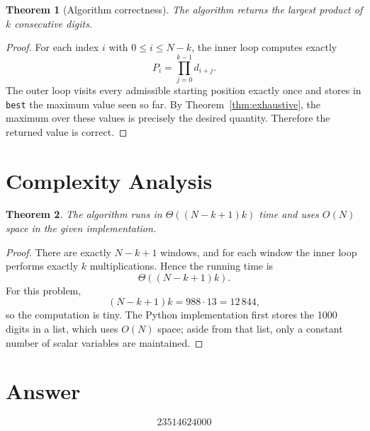 \documentclass[11pt]{article}
\newtheorem{theorem}{Theorem}
\begin{document}
\begin{theorem}[Algorithm correctness]
The algorithm returns the largest product of $k$ consecutive digits.
\end{theorem}

\begin{proof}
For each index $i$ with $0 \le i \le N-k$, the inner loop computes exactly
\[
P_i = \prod_{j=0}^{k-1} d_{i+j}.
\]
The outer loop visits every admissible starting position exactly once and stores in \texttt{best} the maximum value seen so far. By Theorem~\ref{thm:exhaustive}, the maximum over these values is precisely the desired quantity. Therefore the returned value is correct.
\end{proof}

\section{Complexity Analysis}

\begin{theorem}
The algorithm runs in $\Theta((N-k+1)k)$ time and uses $O(N)$ space in the given implementation.
\end{theorem}

\begin{proof}
There are exactly $N-k+1$ windows, and for each window the inner loop performs exactly $k$ multiplications. Hence the running time is
\[
\Theta((N-k+1)k).
\]
For this problem,
\[
(N-k+1)k = 988 \cdot 13 = 12\,844,
\]
so the computation is tiny. The Python implementation first stores the 1000 digits in a list, which uses $O(N)$ space; aside from that list, only a constant number of scalar variables are maintained.
\end{proof}

\section{Answer}

\[
\boxed{23514624000}
\]
\end{document}
